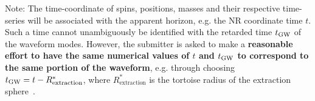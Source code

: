 \documentclass[11pt,tightenlines,article,amssymb,amsmath,amsfonts,superscriptaddress,nofootinbib]{revtex4}
\newcommand{\harald}[1]{\textcolor{Cerulean}{#1}}
\newcommand{\tGW}{t_{\rm GW}}
\begin{document}
\harald{Note: The time-coordinate of spins, positions, masses and their
respective time-series will be associated with the apparent horizon,
e.g. the NR coordinate time $t$. Such a time cannot
unambiguously be identified with the retarded time $\tGW$ of the
waveform modes.
\label{tGW-vs-tNR}
However, the submitter is asked to make a {\bf reasonable
effort to have the same numerical values of $t$ and $\tGW$
to correspond to the same portion of the waveform}, e.g. through
choosing $\tGW = t - R^*_\mathrm{extraction}$, where
$R^*_\mathrm{extraction}$ is the tortoise radius of the extraction sphere~\cite{Fiske:2005fx,Boyle:2009vi}.}  \\
\newline

\noindent
\end{document}
